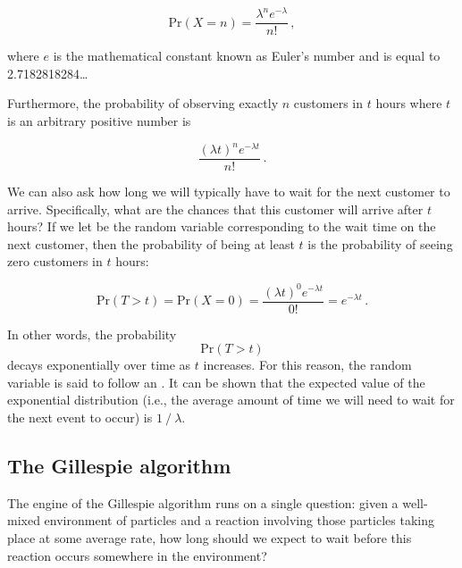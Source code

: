 $$\mathrm{Pr}(X = n) = \frac{\lambda^n e^{-\lambda}}{n!}\,,$$

where $e$ is the mathematical constant known as Euler's number and is equal to 2.7182818284…\\

\begin{note}\end{note}

Furthermore, the probability of observing exactly $n$ customers in $t$ hours where $t$ is an arbitrary positive number is

$$\frac{(\lambda t)^n e^{-\lambda t}}{n!}\,.$$

We can also ask how long we will typically have to wait for the next customer to arrive. Specifically, what are the chances that this customer will arrive after $t$ hours? If we let  be the random variable corresponding to the wait time on the next customer, then the probability of  being at least $t$ is the probability of seeing zero customers in $t$ hours:

$$\mathrm{Pr}(T > t) = \mathrm{Pr}(X = 0) = \frac{(\lambda t)^0 e^{-\lambda t}}{0!} = e^{-\lambda t}\,.$$

In other words, the probability $$\mathrm{Pr}(T > t)$$ decays exponentially over time as $t$ increases. For this reason, the random variable  is said to follow an . It can be shown that the expected value of the exponential distribution (i.e., the average amount of time we will need to wait for the next event to occur) is $1\mathbin{/}\lambda$.\\

\begin{qbox}\end{qbox}


\FloatBarrier
{}
\subsection{The Gillespie algorithm}

The engine of the Gillespie algorithm runs on a single question: given a well-mixed environment of particles and a reaction involving those particles taking place at some average rate, how long should we expect to wait before this reaction occurs somewhere in the environment?

